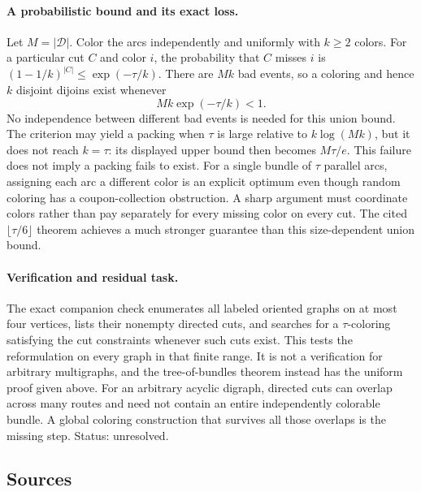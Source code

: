 \documentclass[11pt,a4paper]{article}
\begin{document}
\paragraph{A probabilistic bound and its exact loss.}
Let $M=|\mathcal D|$. Color the arcs independently and uniformly with
$k\geq2$ colors. For a particular cut $C$ and color $i$, the probability
that $C$ misses $i$ is
$(1-1/k)^{|C|}\leq\exp(-\tau/k)$. There are $Mk$ bad events, so a
coloring and hence $k$ disjoint dijoins exist whenever
\[
 Mk\exp(-\tau/k)<1.
\]
No independence between different bad events is needed for this union
bound. The criterion may yield a packing when $\tau$ is large relative
to $k\log(Mk)$, but it does not reach $k=\tau$: its displayed upper
bound then becomes $M\tau/e$. This failure does not imply a packing
fails to exist. For a single bundle of $\tau$ parallel arcs, assigning
each arc a different color is an explicit optimum even though random
coloring has a coupon-collection obstruction. A sharp argument must
coordinate colors rather than pay separately for every missing color
on every cut. The cited $\lfloor\tau/6\rfloor$ theorem achieves a much
stronger guarantee than this size-dependent union bound.

\paragraph{Verification and residual task.}
The exact companion check enumerates all labeled oriented graphs on
at most four vertices, lists their nonempty directed cuts, and searches
for a $\tau$-coloring satisfying the cut constraints whenever such cuts
exist. This tests the reformulation on every graph in that finite
range. It is not a verification for arbitrary multigraphs, and the
tree-of-bundles theorem instead has the uniform proof given above.
For an arbitrary acyclic digraph, directed cuts can overlap across
many routes and need not contain an entire independently colorable
bundle. A global coloring construction that survives all those
overlaps is the missing step. Status: unresolved.

\subsection{Sources}
\end{document}
